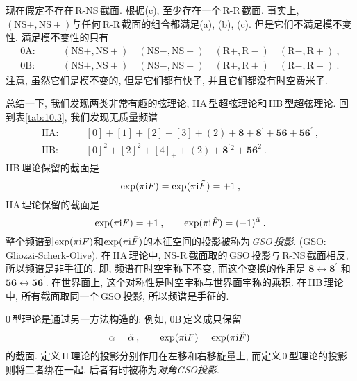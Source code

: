 现在假定不存在\,R-NS\,截面. 根据(c), 至少存在一个\,R-R\,截面. 事实上, $(\text{NS}+,\text{NS}+)$与任何\,R-R\,截面的组合都满足(a), (b), (c). 但是它们不满足模不变性. 满足模不变性的只有
\begin{align*}
     \text{0A}:&\qquad (\text{NS}+,\text{NS}+)\quad (\text{NS}-,\text{NS}-)\quad (\text{R}+,\text{R}-)\quad (\text{R}-,\text{R}+) \:, \\
    \text{0B}:& \qquad (\text{NS}+,\text{NS}+)\quad (\text{NS}-,\text{NS}-)\quad (\text{R}+,\text{R}+)\quad (\text{R}-,\text{R}-) \:.
\end{align*}
注意, 虽然它们是模不变的, 但是它们都有快子, 并且它们都没有时空费米子.

总结一下, 我们发现两类非常有趣的弦理论, IIA\,型超弦理论和\,IIB\,型超弦理论. 回到表\ref{tab:10.3}, 我们发现无质量频谱
\begin{subequations}
    \begin{align}
        \text{IIA:}&\qquad [0]+[1]+[2]+[3]+(2)+\mathbf{8}+\mathbf{8}^{\prime}+\mathbf{56}+\mathbf{56}^{\prime} \:,\label{10.6.8a} \\
        \text{IIB:}&\qquad [0]^{2}+[2]^{2}+[4]_{+}+(2) +\mathbf{8}^{\prime}{}^{2}+\mathbf{56}^{2} \:.\label{10.6.8b} 
    \end{align} \label{10.6.8}
\end{subequations}
IIB\,理论保留的截面是
\begin{equation}
    \exp(\pi\mathrm{i} F) =\exp(\pi\mathrm{i}\tilde{F})=+1 \:,\label{10.6.9}
\end{equation}
IIA\,理论保留的截面是
\begin{equation}
    \exp(\pi\mathrm{i} F) = +1 \:, \qquad \exp(\pi\mathrm{i}\tilde{F})=(-1)^{\tilde{\alpha}} \:.\label{10.6.10}
\end{equation}
整个频谱到$ \exp(\pi\mathrm{i} F) $和$ \exp(\pi\mathrm{i}\tilde{F}) $的本征空间的投影被称为\,\emph{GSO}\,{\emph{投影}}. (GSO: Gliozzi-Scherk-Olive). 在\,IIA\,理论中, NS-R\,截面取的\,GSO\,投影与\,R-NS\,截面相反, 所以频谱是非手征的. 即, 频谱在时空宇称下不变, 而这个变换的作用是 $\mathbf{8}\leftrightarrow\mathbf{8}^{\prime}$ 和 $\mathbf{56}\leftrightarrow\mathbf{56}^{\prime}$. 在世界面上, 这个对称性是时空宇称与世界面宇称的乘积. 在\,IIB\,理论中, 所有截面取同一个\,GSO\,投影, 所以频谱是手征的.

0\,型理论是通过另一方法构造的: 例如, 0B\,定义成只保留
\begin{equation}
    \alpha=\tilde{\alpha}\:, \qquad \exp(\pi\mathrm{i} F) =\exp(\pi\mathrm{i}\tilde{F})\: \label{10.6.11}
\end{equation}
的截面. 定义\,II\,理论的投影分别作用在左移和右移旋量上, 而定义\,0\,型理论的投影则将二者绑在一起. 后者有时被称为{\emph{对角}}\emph{GSO}{\emph{投影}}.

